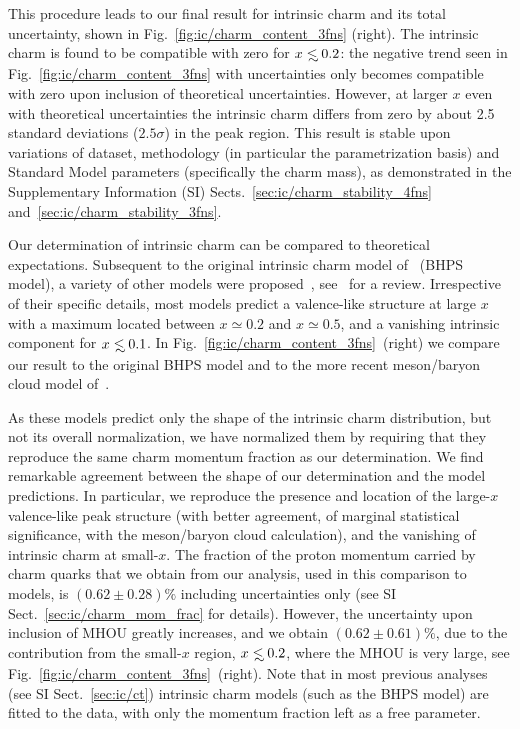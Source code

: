 This procedure leads to our final result for intrinsic charm and its total
uncertainty, shown in Fig.~\ref{fig:ic/charm_content_3fns} (right).
%
The intrinsic charm \pdf is found to be compatible with zero for
$x\lsim 0.2$: the negative trend 
seen  in Fig.~\ref{fig:ic/charm_content_3fns} with \pdf uncertainties only 
becomes 
compatible with zero upon inclusion of  theoretical
uncertainties. However, at
larger $x$ even with theoretical uncertainties
the intrinsic charm \pdf
 differs 
from zero by about 2.5 standard deviations ($2.5\sigma$) in the peak region.
%
This result  is stable upon variations of dataset, methodology (in
particular the \pdf  parametrization basis) and Standard Model
parameters (specifically the charm mass),
as demonstrated in the Supplementary Information (SI) Sects.~\ref{sec:ic/charm_stability_4fns}
and~\ref{sec:ic/charm_stability_3fns}. 

Our determination of intrinsic charm can be compared to theoretical expectations.
%
Subsequent to the
original intrinsic charm model of~\cite{Brodsky:1980pb} (BHPS
model),
a variety of other models were  
proposed~\cite{Hoffmann:1983ah,Pumplin:2005yf,Paiva:1996dd,Steffens:1999hx,Hobbs:2013bia},
see~\cite{Brodsky:2015fna} for a review.
%
Irrespective of their specific details, most models predict a valence-like
structure at large $x$ 
with a maximum located  between $x\simeq 0.2$ and $x\simeq 0.5$, and a
vanishing intrinsic component for
$x\lsim 0.1$.
%
In Fig.~\ref{fig:ic/charm_content_3fns}~(right) we compare our result to
the original BHPS model and to the more recent meson/baryon cloud model of~\cite{Hobbs:2013bia}.

As these models predict only the shape of the
intrinsic charm distribution, but not 
its overall normalization, we have normalized them by requiring
that they reproduce the same 
charm momentum fraction as our determination.
%
We find remarkable agreement between the shape of our 
determination and the model predictions.
%
In particular, we reproduce  the presence and location of the large-$x$ valence-like peak
structure (with  better agreement, of marginal statistical significance, with
the meson/baryon cloud calculation),  and the vanishing of 
intrinsic charm at small-$x$.
%
The fraction of the proton momentum carried by charm quarks that we
obtain from our analysis, 
used in this comparison to models,  is $\left( 0.62 \pm 0.28\right) \%$
including \pdf uncertainties only (see
SI Sect.~\ref{sec:ic/charm_mom_frac} for details).
%
However, the uncertainty
upon inclusion of MHOU greatly increases, and we obtain
$\left( 0.62 \pm 0.61\right) \%$, due to the contribution from the small-$x$
region, $x\lsim 0.2$, where the MHOU is very large, see
Fig.~\ref{fig:ic/charm_content_3fns}~(right).
%
%
Note that in most previous
analyses~\cite{Hou:2017khm} (see SI Sect.~\ref{sec:ic/ct}) intrinsic charm models (such as the BHPS
model) are fitted to the data, with only the momentum fraction left as
a free parameter.

